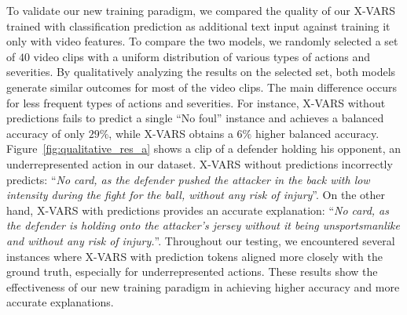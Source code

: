 To validate our new training paradigm, we compared the quality of our X-VARS trained with classification prediction as additional text input against training it only with video features. To compare the two models, we randomly selected a set of $40$ video clips with a uniform distribution of various types of actions and severities. %
By qualitatively analyzing the results on the selected set, both models generate similar outcomes for most of the video clips. The main difference occurs for less frequent types of actions and severities. For instance, X-VARS without predictions fails to predict a single ``No foul'' instance and achieves a balanced accuracy of only $29\%$, while X-VARS obtains a $6\%$ higher balanced accuracy. 
Figure~\ref{fig:qualitative_res_a} shows a clip of a defender holding his opponent, an underrepresented action in our dataset. X-VARS without predictions incorrectly predicts: ``\textit{No card, as the defender pushed the attacker in the back with low intensity during the fight for the ball, without any risk of injury}''.
On the other hand, X-VARS with predictions provides an accurate explanation: ``\textit{No card, as the defender is holding onto the attacker’s jersey without it being unsportsmanlike and without any risk of injury.}''. 
Throughout our testing, we encountered several instances where X-VARS with prediction tokens aligned more closely with the ground truth, especially for underrepresented actions.
These results show the effectiveness of our new training paradigm in achieving higher accuracy and more accurate explanations.

